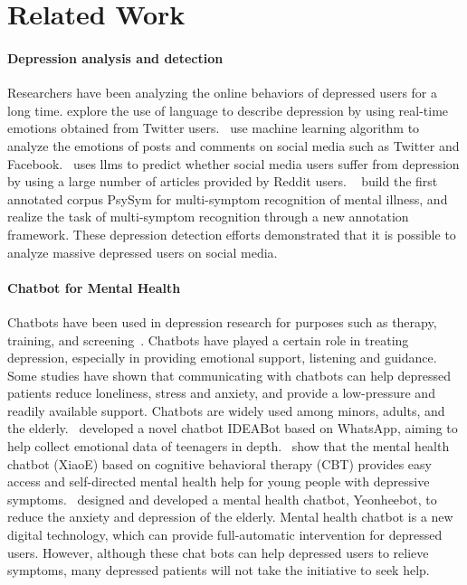 \section{Related Work}
\label{sec:related}
\paragraph{Depression analysis and detection}
Researchers have been analyzing the online behaviors of depressed users for a long time.
\citet{park2012depressive} explore the use of language to describe depression by using real-time emotions 
obtained from Twitter users.~\citet{saha2021sentiment} use machine learning algorithm to analyze the emotions of posts and comments on social media such as Twitter and Facebook.~\citet{wang2024explainable} uses llms to predict whether social media users suffer from depression by using a large number of articles provided by Reddit users. ~\citet{zhang2022symptom} build the first annotated corpus PsySym for multi-symptom recognition of mental illness, and realize the task of multi-symptom recognition through a new annotation framework.
These depression detection efforts demonstrated that it is possible to analyze massive depressed users on 
social media. 


\paragraph{Chatbot for Mental Health}
Chatbots have been used in depression research for purposes such as therapy, training, and 
screening~\cite{abd2019overview}. Chatbots have played a certain role in treating depression, 
especially in providing emotional support, listening and guidance. Some studies have shown that communicating 
with chatbots can help depressed patients reduce loneliness, stress and anxiety, and provide a low-pressure 
and readily available support. Chatbots are widely used among minors, adults, and the elderly.~\citet{viduani2023assessing} developed a novel chatbot IDEABot based on WhatsApp, 
aiming to help collect emotional data of teenagers in depth.~\citet{he2022mental} show that the mental health chatbot (XiaoE) based on cognitive behavioral therapy (CBT) provides easy access and self-directed mental health help for young people with depressive symptoms.~\citet{ryu2020simple} designed and developed a mental health chatbot, Yeonheebot, to reduce the anxiety and depression of the elderly.
Mental health chatbot is a new digital technology, which can provide full-automatic intervention for depressed users. 
However, although these chat bots can help depressed users to relieve symptoms, many depressed patients will not take the initiative to seek help.



